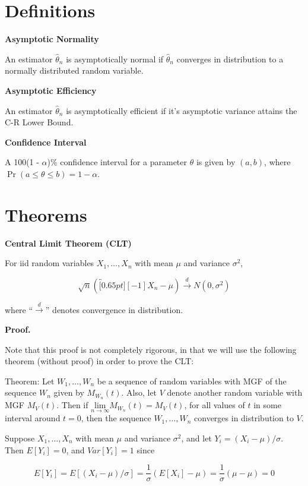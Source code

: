 \documentclass[
  letterpaper,
  DIV=11,
  numbers=noendperiod]{scrreprt}
\begin{document}
\hypertarget{definitions-5}{%
\section{Definitions}\label{definitions-5}}

\textbf{Asymptotic Normality}

An estimator \(\hat{\theta}_n\) is asymptotically normal if
\(\hat{\theta}_n\) converges in distribution to a normally distributed
random variable.

\textbf{Asymptotic Efficiency}

An estimator \(\hat{\theta}_n\) is asymptotically efficient if it's
asymptotic variance attains the C-R Lower Bound.

\textbf{Confidence Interval}

A 100(1 - \(\alpha\))\% confidence interval for a parameter \(\theta\)
is given by \((a, b)\), where
\(\Pr(a \leq \theta \leq b) = 1 - \alpha\).

\hypertarget{theorems-5}{%
\section{Theorems}\label{theorems-5}}

\textbf{Central Limit Theorem (CLT)}

For iid random variables \(X_1, \dots, X_n\) with mean \(\mu\) and
variance \(\sigma^2\),

\[
\sqrt{n} (\overbracket[0.65pt][-1]{X_n} - \mu) \overset{d}{\to} N(0, \sigma^2)
\]

where ``\(\overset{d}{\to}\)'' denotes convergence in distribution.

\textbf{Proof.}

Note that this proof is not completely rigorous, in that we will use the
following theorem (without proof) in order to prove the CLT:

Theorem: Let \(W_1, \dots, W_n\) be a sequence of random variables with
MGF of the sequence \(W_n\) given by \(M_{W_n}(t)\). Also, let \(V\)
denote another random variable with MGF \(M_V(t)\). Then if
\(\underset{n \to \infty}{\text{lim}} M_{W_n}(t) = M_V(t)\), for all
values of \(t\) in some interval around \(t = 0\), then the sequence
\(W_1, \dots, W_n\) converges in distribution to \(V\).

Suppose \(X_1, \dots, X_n\) with mean \(\mu\) and variance \(\sigma^2\),
and let \(Y_i = (X_i - \mu)/\sigma\). Then \(E[Y_i] = 0\), and
\(Var[Y_i] = 1\) since

\[
E[Y_i] = E \left[ (X_i - \mu)/\sigma\right] = \frac{1}{\sigma} (E[X_i] - \mu) = \frac{1}{\sigma} (\mu - \mu) = 0
\]
\end{document}
